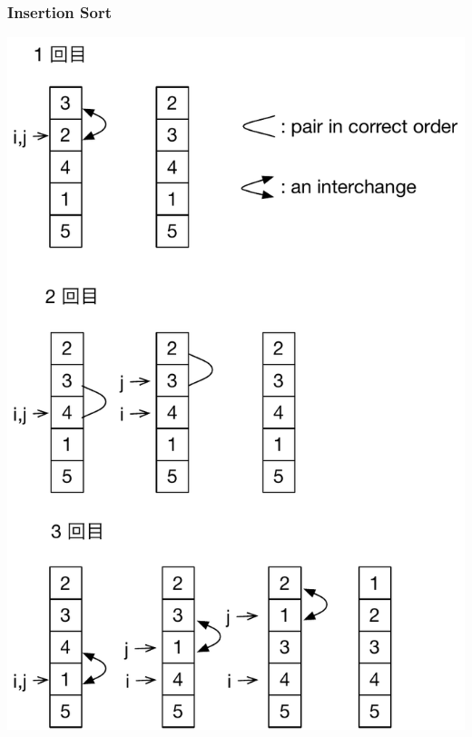 \begin{frame}[shrink]
\frametitle{Insertion Sort}
  \begin{center}
\includegraphics[scale=0.4]{./Figure/insertion_sort.pdf}
  \end{center}
\end{frame}
